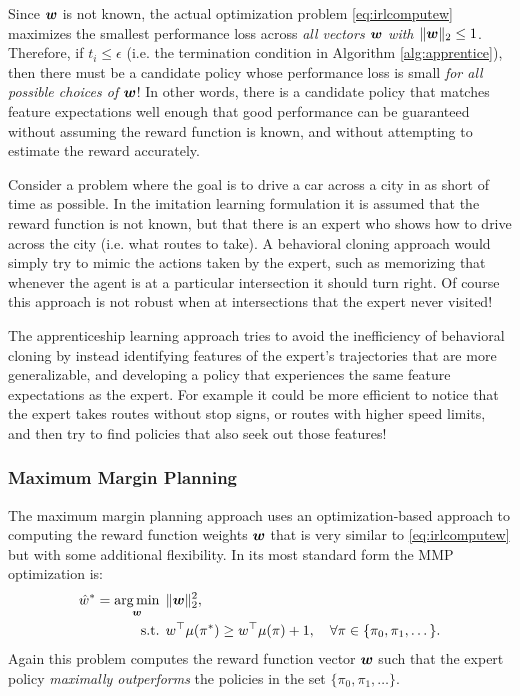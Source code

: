 Since $\bm{w}$ is not known, the actual optimization problem \eqref{eq:irlcomputew} maximizes the smallest performance loss across \textit{all vectors $\bm{w}$ with $\lVert \bm{w} \rVert_2 \leq 1$}. Therefore, if $t_i \leq \epsilon$ (i.e. the termination condition in Algorithm \ref{alg:apprentice}), then there must be a candidate policy whose performance loss is small \textit{for all possible choices of $\bm{w}$}! In other words, there is a candidate policy that matches feature expectations well enough that good performance can be guaranteed without assuming the reward function is known, and without attempting to estimate the reward accurately.



\begin{example} \label{ex:apprentice}
Consider a problem where the goal is to drive a car across a city in as short of time as possible. In the imitation learning formulation it is assumed that the reward function is not known, but that there is an expert who shows how to drive across the city (i.e. what routes to take). A behavioral cloning approach would simply try to mimic the actions taken by the expert, such as memorizing that whenever the agent is at a particular intersection it should turn right. Of course this approach is not robust when at intersections that the expert never visited!

The apprenticeship learning approach tries to avoid the inefficiency of behavioral cloning by instead identifying features of the expert's trajectories that are more generalizable, and developing a policy that experiences the same feature expectations as the expert. For example it could be more efficient to notice that the expert takes routes without stop signs, or routes with higher speed limits, and then try to find policies that also seek out those features!
\end{example}

\subsubsection{Maximum Margin Planning}
The maximum margin planning approach\cite{RatliffBagnellEtAl2006} uses an optimization-based approach to computing the reward function weights $\bm{w}$ that is very similar to \eqref{eq:irlcomputew} but with some additional flexibility. In its most standard form the MMP optimization is:
\begin{equation*} \label{eq:mmp_simple}
\begin{split}
\hat{w}^* = \underset{\bm{w}}{\arg\min} \:\: & \lVert \bm{w} \rVert_2^2,\\
\text{s.t.} \:\:& w^\top \mu(\pi^*) \geq w^\top \mu(\pi) + 1, \quad \forall \pi \in  \{\pi_0, \pi_1, \dots\}.
\end{split}
\end{equation*}
Again this problem computes the reward function vector $\bm{w}$ such that the expert policy \textit{maximally outperforms} the policies in the set $\{\pi_0, \pi_1, \dots\}$.

